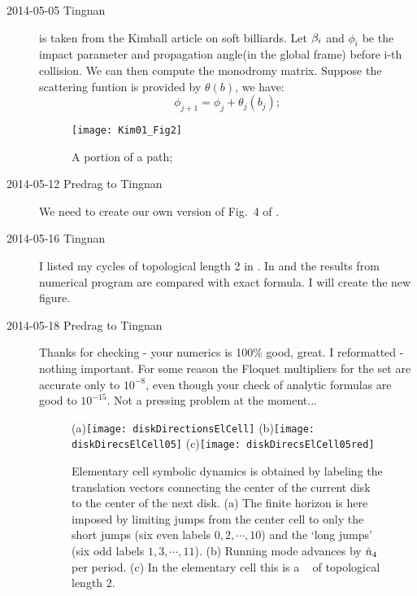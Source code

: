 \begin{description}


\item[2014-05-05 Tingnan]
 is taken from the Kimball article on soft
    billiards. Let $\beta_i$ and $\phi_i$ be the impact parameter and
    propagation angle(in the global frame) before i-th collision. We
    can then compute the monodromy matrix. Suppose the scattering
    funtion is provided by $\theta(b)$, we have:
\[
\phi_{j+1} = \phi_j + \theta_j(b_j);
\]


\begin{figure}
\begin{center}
\texttt{[image: Kim01\_Fig2]}
\end{center}
\caption{
	A portion of a path;
}
\label{KimFig2}
\end{figure}

\item[2014-05-12 Predrag to Tingnan]
We need to create our own version of Fig.~4 of .


\item[2014-05-16 Tingnan] I listed my cycles of topological
    length 2 in . In 
    and  the results from numerical program are
    compared with exact formula. I will create the new figure.

\item[2014-05-18 Predrag to Tingnan] Thanks for checking - your
    numerics is 100\% good, great. I reformatted
     - nothing important. For some reason the
    Floquet multipliers for the  set are accurate only to
    $10^{-8}$, even though your check of analytic formulas are good to
    $10^{-15}$. Not a pressing problem at the moment...

\begin{figure}
\begin{center}
(a)\texttt{[image: diskDirectionsElCell]}
(b)\texttt{[image: diskDirecsElCell05]}
(c)\texttt{[image: diskDirecsElCell05red]}
\end{center}
\caption{
Elementary cell symbolic dynamics is obtained by labeling the translation
vectors connecting the center of the current disk to the center of the
next disk.
(a) The finite horizon is here imposed by limiting jumps from the
center cell to only the short jumps (six even labels $0, 2,\cdots,10$)
and the `long jumps' (six odd labels $1, 3,\cdots,11$).
(b) Running mode  advances by $\hat n_4$ per period.
(c) In the elementary cell this is a \po\ 
    of topological length 2.
    }
\label{diskDirectionsElCell}
\end{figure}


\end{description}
